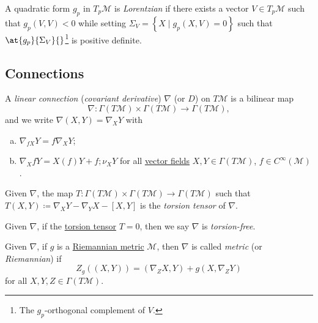 \begin{definition}[Lorentzian]\label{def:Lorentzian}
	A quadratic form \(g_p\) in \(T_{p} \mathcal{M} \) is \emph{Lorentzian} if there exists a vector \(V\in T_p \mathcal{M} \) such that \(g_p(V, V) < 0\) while setting \(\Sigma _V = \left\{ X \mid g_p(X, V) = 0 \right\}\) such that \(\at{g_p}{\Sigma _V}{} \)\footnote{The \(g_p\)-orthogonal complement of \(V\).} is positive definite.
\end{definition}

\subsection{Connections}

\begin{definition}\label{def:linear-connection}
	A \emph{linear connection} (\emph{covariant derivative}) \(\nabla \) (or \(D\)) on \(T\mathcal{M} \) is a bilinear map
	\[
		\nabla \colon \Gamma (T \mathcal{M} ) \times \Gamma (T \mathcal{M} ) \to \Gamma (T \mathcal{M} ),
	\]
	and we write \(\nabla (X, Y) = \nabla _X Y\) with
	\begin{enumerate}[(a)]
		\item \(\nabla _{fX}Y = f \nabla _X Y\);
		\item \(\nabla _X fY = X(f)Y + f;\nu _X Y\) for all \hyperref[def:vector-field]{vector fields} \(X, Y\in \Gamma (T \mathcal{M} )\), \(f\in C^{\infty} (\mathcal{M} )\).
	\end{enumerate}
\end{definition}


\begin{definition}\label{def:torsion-tensor}
	Given \(\nabla \), the map \(T\colon \Gamma (T \mathcal{M} )\times \Gamma (T \mathcal{M} )\to \Gamma (T \mathcal{M} )\) such that \(T(X, Y) \coloneqq \nabla _X Y - \nabla _Y X - [X, Y]\) is the \emph{torsion tensor} of \(\nabla \).
\end{definition}

\begin{definition}\label{def:torsion-free}
	Given \(\nabla \), if the \hyperref[def:torsion-tensor]{torsion tensor} \(T= 0\), then we say \(\nabla \) is \emph{torsion-free}.
\end{definition}

\begin{definition}\label{def:metric-connection}
	Given \(\nabla \), if \(g\) is a \hyperref[def:Riemannian-metric]{Riemannian metric} \(\mathcal{M} \), then \(\nabla \) is called \emph{metric} (or \emph{Riemannian}) if
	\[
		Z_g((X, Y)) = (\nabla _Z X, Y) + g(X, \nabla _Z Y)
	\]
	for all \(X, Y, Z\in \Gamma (T \mathcal{M} )\).
\end{definition}

